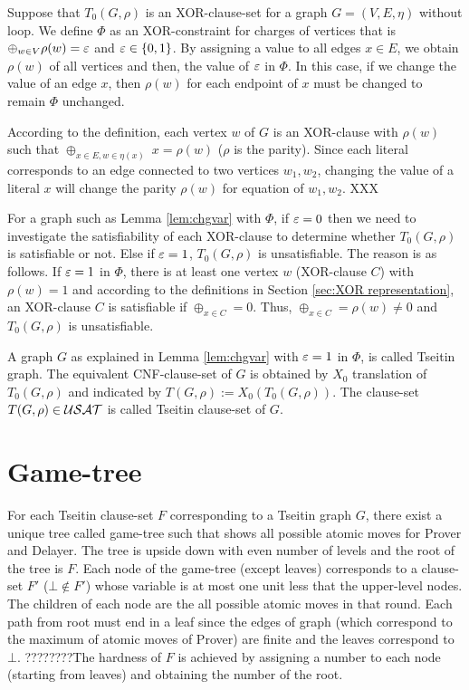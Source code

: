 \documentclass{report}
\begin{document}
\begin{lem}\label{lem:chgvar}
Suppose that $T_0(G,\rho)$ is an XOR-clause-set for a graph $G=(V,E,\eta)$ without loop. We define $\Phi$ as an XOR-constraint for charges of vertices that is $\oplus_{w \in V} \rho(w) = \varepsilon$ and $\varepsilon \in \{ 0,1 \}$. By assigning a value to all edges $x \in E$, we obtain $\rho(w)$ of all vertices and then, the value of $\varepsilon$ in $\Phi$. In this case, if we change the value of an edge $x$, then $\rho(w)$ for each endpoint of $x$ must be changed to remain $\Phi$ unchanged.
\end{lem}
\begin{prf}
According to the definition, each vertex $w$ of $G$ is an XOR-clause with $\rho(w)$ such that  $\oplus_{x \in E, w \in \eta(x)} \; x = \rho(w)$ ($\rho$ is the parity). Since each literal corresponds to an edge connected to two vertices $w_1, w_2$, changing the value of a literal $x$ will change the parity $\rho(w)$ for equation of $w_1, w_2$. XXX
\end{prf}

For a graph such as Lemma \ref{lem:chgvar} with $\Phi$, if $\varepsilon=0$ then we need to investigate the satisfiability of each XOR-clause to determine whether $T_0(G,\rho)$ is satisfiable or not. Else if $\varepsilon=1$, $T_0(G,\rho)$ is unsatisfiable. The reason is as follows. If $\varepsilon=1$ in $\Phi$, there is at least one vertex $w$ (XOR-clause $C$) with $ \rho(w) =1$ and according to the definitions in Section \ref{sec:XOR representation}, an XOR-clause $C$ is satisfiable if $\oplus_{x \in C} = 0$. Thus, $\oplus_{x \in C} = \rho(w) \not =0$ and $T_0(G,\rho)$ is unsatisfiable.

A graph $G$ as explained in Lemma \ref{lem:chgvar} with $\varepsilon=1$ in $\Phi$, is called Tseitin graph. The equivalent CNF-clause-set of $G$ is obtained by $X_0$ translation of $T_0(G,\rho)$ and indicated by $T(G,\rho) := X_0(T_0(G,\rho))$. The clause-set $T(G,\rho) \in \mathcal{USAT}$ is called Tseitin clause-set of $G$.

\section{Game-tree}
\label{sec:Game-tree}

For each Tseitin clause-set $F$ corresponding to a Tseitin graph $G$, there exist a unique tree called game-tree such that shows all possible atomic moves for Prover and Delayer. The tree is upside down with even number of levels and the root of the tree is $F$. Each node of the game-tree (except leaves) corresponds to a clause-set $F'$ ($ \bot \not \in F'$) whose variable is at most one unit less that the upper-level nodes. The children of each node are the all possible atomic moves in that round. Each path from root must end in a leaf since the edges of graph (which correspond to the maximum of atomic moves of Prover) are finite and the leaves correspond to $\bot$. ????????The hardness of $F$ is achieved by assigning a number to each node (starting from leaves) and obtaining the number of the root.
\end{document}
